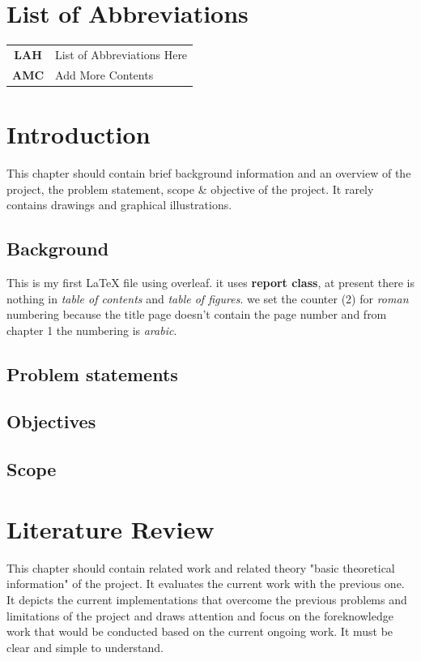 \documentclass[12pt]{report}
\begin{document}
\chapter*{List of Abbreviations}
\begin{tabular}{c l}
\textbf{LAH}     &  List of Abbreviations Here\\
\textbf{AMC}     &  Add More Contents
\end{tabular}
\chapter{Introduction}
This chapter should contain brief background information and an overview of the project, the problem statement, scope \& objective of the project. It rarely contains drawings and graphical illustrations.
\section{Background}
This is my first {\LaTeX} file using overleaf. it uses \textbf{report class}, at present there is nothing in \textit{table of contents} and \textit{table of figures}. we set the counter (2) for \textit{roman} numbering because the title page doesn't contain the page number and from chapter 1 the numbering is \textit{arabic}.
\section{Problem statements}
\section{Objectives}
\section{Scope}
\chapter{Literature Review}
This chapter should contain related work and related theory "basic theoretical information" of the project. It evaluates the current work with the previous one. It depicts the current implementations that overcome the previous problems and limitations of the project and draws attention and focus on the foreknowledge work that would be conducted based on the current ongoing work. It must be clear and simple to understand.
\end{document}
